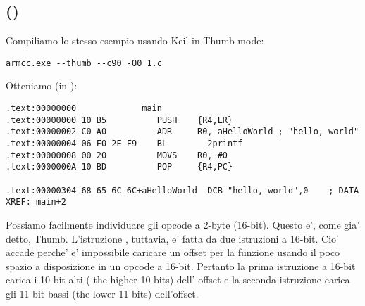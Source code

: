 \subsection{\NonOptimizingKeilVI (\ThumbMode)}

Compiliamo lo stesso esempio usando Keil in Thumb mode:

\begin{lstlisting}
armcc.exe --thumb --c90 -O0 1.c 
\end{lstlisting}

Otteniamo (in \IDA):

\begin{lstlisting}[caption=\NonOptimizingKeilVI (\ThumbMode) + \IDA]
.text:00000000             main
.text:00000000 10 B5          PUSH    {R4,LR}
.text:00000002 C0 A0          ADR     R0, aHelloWorld ; "hello, world"
.text:00000004 06 F0 2E F9    BL      __2printf
.text:00000008 00 20          MOVS    R0, #0
.text:0000000A 10 BD          POP     {R4,PC}

.text:00000304 68 65 6C 6C+aHelloWorld  DCB "hello, world",0    ; DATA XREF: main+2
\end{lstlisting}

Possiamo facilmente individuare gli opcode a 2-byte (16-bit). Questo e', come gia' detto, Thumb.
L'istruzione  , tuttavia, e' fatta da due istruzioni a 16-bit.
Cio' accade perche' e' impossibile caricare un offset per la funzione \printf usando il poco spazio a disposizione in un opcode a 16-bit.
Pertanto la prima istruzione a 16-bit carica i 10 bit alti ( the higher 10 bits) dell' offset e la seconda istruzione carica
gli 11 bit bassi (the lower 11 bits) dell'offset.


